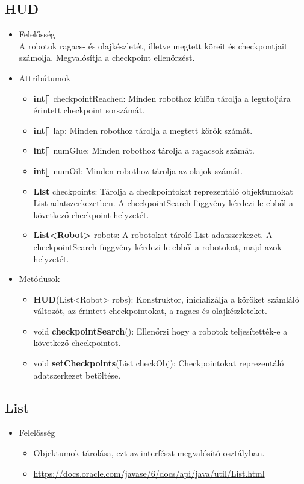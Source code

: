 \subsection{HUD}
\begin{itemize}
\item Felelősség\\
A robotok ragacs- és olajkészletét, illetve megtett köreit és checkpontjait számolja. Megvalósítja a checkpoint ellenőrzést.
\item Attribútumok
	\begin{itemize}
		\item \textbf{int[]} checkpointReached: Minden robothoz külön tárolja a legutoljára érintett checkpoint sorszámát.
		\item \textbf{int[]} lap: Minden robothoz tárolja a megtett körök számát. 
		\item \textbf{int[]} numGlue: Minden robothoz tárolja a ragacsok számát.
		\item \textbf{int[]} numOil: Minden robothoz tárolja az olajok számát.
		\item \textbf{List} checkpoints: Tárolja a checkpointokat reprezentáló objektumokat List adatszerkezetben. A checkpointSearch függvény kérdezi le ebből a következő checkpoint helyzetét. 
		\item \textbf{List<Robot>} robots: A robotokat tároló List adatszerkezet. A checkpointSearch függvény kérdezi le ebből a robotokat, majd azok helyzetét.
	\end{itemize}
\item Metódusok
	\begin{itemize}
		\item \textbf{HUD}(List<Robot> robs): Konstruktor, inicializálja a köröket számláló változót, az érintett checkpointokat, a ragacs és olajkészleteket. 
		\item void \textbf{checkpointSearch}(): Ellenőrzi hogy a robotok teljesítették-e a következő checkpointot.
		\item void \textbf{setCheckpoints}(List checkObj): Checkpointokat reprezentáló adatszerkezet betöltése.
	\end{itemize}
\end{itemize}

\subsection{List}
\begin{itemize}
    \item Felelősség
        \begin{itemize}
        \item Objektumok tárolása, ezt az interfészt megvalósító osztályban.
        \item \url{https://docs.oracle.com/javase/6/docs/api/java/util/List.html}
        \end{itemize}
\end{itemize}

